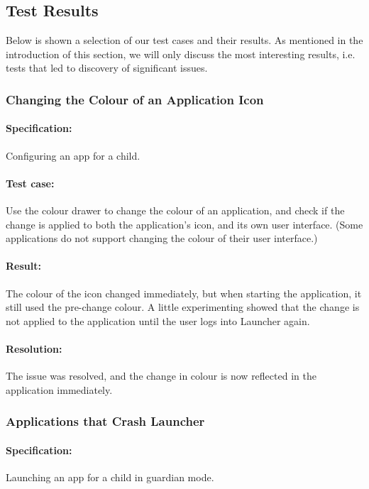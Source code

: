 \subsection{Test Results}\label{sec:testing_sprint1_results}
Below is shown a selection of our test cases and their results.
As mentioned in the introduction of this section, we will only discuss the most interesting results, i.e. tests that led to discovery of significant issues.


\subsubsection{Changing the Colour of an Application Icon}

\paragraph{Specification:} Configuring an app for a child.
\paragraph{Test case:} Use the colour drawer to change the colour of an application, and check if the change is applied to both the application's icon, and its own user interface. (Some applications do not support changing the colour of their user interface.)
\paragraph{Result:} The colour of the icon changed immediately, but when starting the application, it still used the pre-change colour. A little experimenting showed that the change is not applied to the application until the user logs into Launcher again.
\paragraph{Resolution:} The issue was resolved, and the change in colour is now reflected in the application immediately.


\subsubsection{Applications that Crash Launcher}

\paragraph{Specification:} Launching an app for a child in guardian mode.
